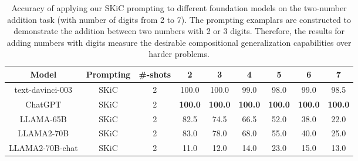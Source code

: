 \documentclass{article} \usepackage{arxiv}
\begin{document}
\begin{table}[ht]
\caption{Accuracy of applying our SKiC prompting to different foundation models on the two-number addition task (with number of digits from 2 to 7). The prompting examplars are constructed to demonstrate the addition between two numbers with 2 or 3 digits. Therefore, the results for adding numbers with  digits measure the desirable compositional generalization capabilities over harder problems.} \label{Tab:add_results_llama2}
\centering
\begin{tabular}{c|c|c|cc|cccc} \toprule
\textbf{Model}             & \textbf{Prompting} &\textbf{\#-shots} & \multicolumn{1}{c}{\textbf{2}} & \multicolumn{1}{c|}{\textbf{3}} & \textbf{4}   & \textbf{5}   & \textbf{6}   & \textbf{7}   \\ \midrule \midrule

\multirow{1}{*}{text-davinci-003}  
                           & SKiC  &2   & 100.0                   & 100.0                   & 99.0  & 98.0  & 99.0  & 98.5  \\  
\multirow{1}{*}{ChatGPT} 
                           & SKiC &2      & \textbf{100.0}                   & \textbf{100.0}                   & \textbf{100.0} & \textbf{100.0} & \textbf{100.0} & \textbf{100.0} \\ \midrule
\multirow{1}{*}{LLAMA-65B} 
                           & SKiC  &2     & 82.5                    & 74.5                    & 66.5  & 52.0  &38.0  & 22.0  \\  
\multirow{1}{*}{LLAMA2-70B} 
                           & SKiC  &2     & 83.0                    &78.0                    & 68.0  &55.0  & 40.0  & 25.0  \\ 

\multirow{1}{*}{LLAMA2-70B-chat} 
                           & SKiC  &2     & 11.0                    & 12.0                 & 14.0  & 23.0  & 15.0  & 13.0  \\ \bottomrule
\end{tabular} 
\end{table}
\end{document}
